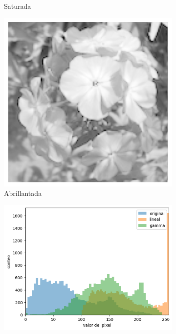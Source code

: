 \documentclass{article}
\begin{document}
\begin{figure}
\begin{subfigure}[b]{0.24\textwidth}
		\caption{Saturada}
		\label{fg:saturada}
	\end{subfigure}
	\begin{subfigure}[b]{0.24\textwidth}
		\includegraphics[width= \textwidth]{imgGrau0p4exp}
		\caption{Abrillantada}
		\label{fg:imgGrau0p4exp}
	\end{subfigure}
	\begin{subfigure}[b]{0.24\textwidth}
		\includegraphics[width= \textwidth]{brightHist}

\end{subfigure}
\end{figure}
\end{document}
